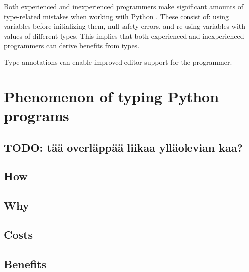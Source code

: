 Both experienced and inexperienced programmers make significant amounts of type-related mistakes when working with Python \cite{khan_empirical_2022}. These consist of: using variables before initializing them, null safety errors, and re-using variables with values of different types. This implies that both experienced and inexperienced programmers can derive benefits from types.

Type annotations can enable improved editor support for the programmer.



\section{Phenomenon of typing Python programs}
\subsection{TODO: tää overläppää liikaa ylläolevian kaa?}


\subsection{How}

\subsection{Why}

\subsection{Costs}

\subsection{Benefits}
